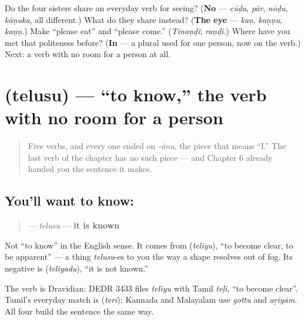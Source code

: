 \begin{tcolorbox}[breakable,colback=teal!4,colframe=teal!35!black,title={Before you move on}]
Do the four sisters share an everyday verb for seeing? (\textbf{No} — \emph{cūḍu}, \emph{pār}, \emph{nōḍu}, \emph{kāṇuka}, all different.) What do they share instead? (\textbf{The eye} — \emph{kaṇ}, \emph{kaṇṇu}, \emph{kaṇṇ}.) Make \textquotedblleft{}please eat\textquotedblright{} and \textquotedblleft{}please come.\textquotedblright{} (\emph{Tinaṇḍi}; \emph{raṇḍi}.) Where have you met that politeness before? (\textbf{In } — a plural used for one person, now on the verb.) Next: a verb with no room for a person at all.
\end{tcolorbox}
\section[\texorpdfstring{\te{తెలుసు} (telusu)}{తెలుసు (telusu)}]{ (telusu) — \textquotedblleft{}to know,\textquotedblright{} the verb with no room for a person}

\label{lesson:TE-C32-telusu}



\begin{quote}
Five verbs, and every one ended on \emph{-ānu}, the piece that means \textquotedblleft{}I.\textquotedblright{} The last verb of the chapter has no such piece — and Chapter 6 already handed you the sentence it makes.
\end{quote}

\subsection*{You'll want to know: }
\begin{quote}
\textbf{} — \emph{telusu} — \textbf{it is known}
\end{quote}

Not \textquotedblleft{}to know\textquotedblright{} in the English sense. It comes from \textbf{} (\emph{teliyu}), \textquotedblleft{}to become clear, to be apparent\textquotedblright{} — a thing \emph{telusu}-es to you the way a shape resolves out of fog. Its negative is \textbf{} (\emph{teliyadu}), \textquotedblleft{}it is not known.\textquotedblright{}

The verb is Dravidian: DEDR 3433 files \emph{teliyu} with Tamil \emph{teḷi}, \textquotedblleft{}to become clear\textquotedblright{}. Tamil's everyday match is \textbf{} (\emph{teri}); Kannada and Malayalam use \emph{gottu} and \emph{aṟiyām}. All four build the sentence the same way.

